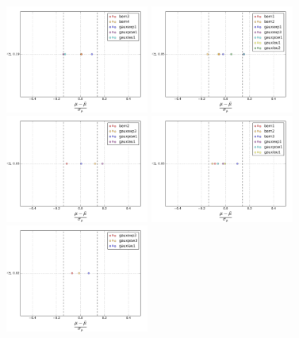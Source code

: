 \begin{figure}[htbp]
  \begin{center}
		\includegraphics[width=0.42\textwidth]{figures/chapter04/Bias/M1.png}
        \includegraphics[width=0.42\textwidth]{figures/chapter04/Bias/M2.png} \\
		\includegraphics[width=0.42\textwidth]{figures/chapter04/Bias/M3.png}
		\includegraphics[width=0.42\textwidth]{figures/chapter04/Bias/M4.png}\\
		\includegraphics[width=0.42\textwidth]{figures/chapter04/Bias/M5.png}

\end{center}
\end{figure}
